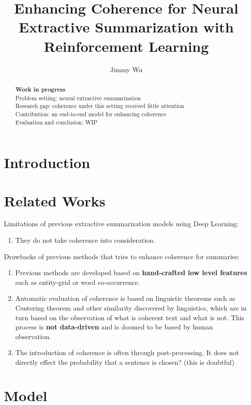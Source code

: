 \documentclass[]{article}
\title{Enhancing Coherence for Neural Extractive Summarization with Reinforcement Learning}  %
\author{Jimmy Wu}
\begin{document}
\maketitle

\begin{abstract}
\textbf{Work in progress}\\
Problem setting: neural extractive summarization \\
Research gap: coherence under this setting received little attention \\
Contribution: an end-to-end model for enhancing coherence \\
Evaluation and conclusion: WIP \\

\end{abstract}

\section{Introduction}


\section{Related Works}
Limitations of previous extractive summarization models using Deep Learning:
\begin{enumerate}
	\item They do not take coherence into consideration.
\end{enumerate}


Drawbacks of previous methods that tries to enhance coherence for summaries:
\begin{enumerate}
	\item Previous methods are developed based on \textbf{hand-crafted low level features} such as entity-grid or word co-occurrence.
	\item Automatic evaluation of coherence is based on linguistic theorems such as Centering theorem and other similarity discovered by linguistics, which are in turn based on the observation of what is coherent text and what is not. This process is \textbf{not data-driven} and is doomed to be based by human observation.
	\item The introduction of coherence is often through post-processing. It does not directly effect the probability that a sentence is chosen? (this is doubtful)
\end{enumerate}


\section{Model}
\end{document}
